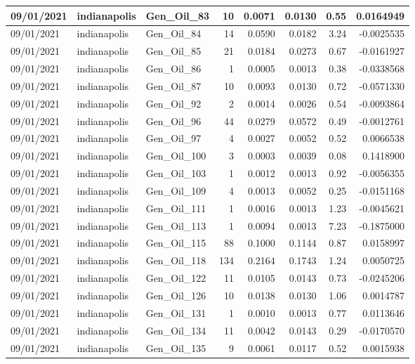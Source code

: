 \documentclass[
  letterpaper,
  DIV=11,
  numbers=noendperiod]{scrartcl}
\begin{document}
\begin{tabular}{l|l|l|r|r|r|r|r}
\hline
09/01/2021 & indianapolis & Gen\_Oil\_83 & 10 & 0.0071 & 0.0130 & 0.55 & 0.0164949\\
\hline
09/01/2021 & indianapolis & Gen\_Oil\_84 & 14 & 0.0590 & 0.0182 & 3.24 & -0.0025535\\
\hline
09/01/2021 & indianapolis & Gen\_Oil\_85 & 21 & 0.0184 & 0.0273 & 0.67 & -0.0161927\\
\hline
09/01/2021 & indianapolis & Gen\_Oil\_86 & 1 & 0.0005 & 0.0013 & 0.38 & -0.0338568\\
\hline
09/01/2021 & indianapolis & Gen\_Oil\_87 & 10 & 0.0093 & 0.0130 & 0.72 & -0.0571330\\
\hline
09/01/2021 & indianapolis & Gen\_Oil\_92 & 2 & 0.0014 & 0.0026 & 0.54 & -0.0093864\\
\hline
09/01/2021 & indianapolis & Gen\_Oil\_96 & 44 & 0.0279 & 0.0572 & 0.49 & -0.0012761\\
\hline
09/01/2021 & indianapolis & Gen\_Oil\_97 & 4 & 0.0027 & 0.0052 & 0.52 & 0.0066538\\
\hline
09/01/2021 & indianapolis & Gen\_Oil\_100 & 3 & 0.0003 & 0.0039 & 0.08 & 0.1418900\\
\hline
09/01/2021 & indianapolis & Gen\_Oil\_103 & 1 & 0.0012 & 0.0013 & 0.92 & -0.0056355\\
\hline
09/01/2021 & indianapolis & Gen\_Oil\_109 & 4 & 0.0013 & 0.0052 & 0.25 & -0.0151168\\
\hline
09/01/2021 & indianapolis & Gen\_Oil\_111 & 1 & 0.0016 & 0.0013 & 1.23 & -0.0045621\\
\hline
09/01/2021 & indianapolis & Gen\_Oil\_113 & 1 & 0.0094 & 0.0013 & 7.23 & -0.1875000\\
\hline
09/01/2021 & indianapolis & Gen\_Oil\_115 & 88 & 0.1000 & 0.1144 & 0.87 & 0.0158997\\
\hline
09/01/2021 & indianapolis & Gen\_Oil\_118 & 134 & 0.2164 & 0.1743 & 1.24 & 0.0050725\\
\hline
09/01/2021 & indianapolis & Gen\_Oil\_122 & 11 & 0.0105 & 0.0143 & 0.73 & -0.0245206\\
\hline
09/01/2021 & indianapolis & Gen\_Oil\_126 & 10 & 0.0138 & 0.0130 & 1.06 & 0.0014787\\
\hline
09/01/2021 & indianapolis & Gen\_Oil\_131 & 1 & 0.0010 & 0.0013 & 0.77 & 0.0113646\\
\hline
09/01/2021 & indianapolis & Gen\_Oil\_134 & 11 & 0.0042 & 0.0143 & 0.29 & -0.0170570\\
\hline
09/01/2021 & indianapolis & Gen\_Oil\_135 & 9 & 0.0061 & 0.0117 & 0.52 & 0.0015938\\

\end{tabular}
\end{document}
